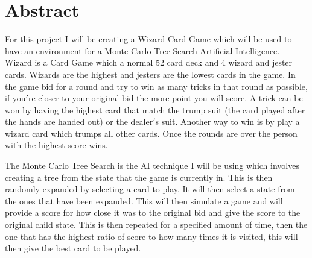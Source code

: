 \thispagestyle{empty}


\section*{\centering Abstract}

For this project I will be creating a Wizard Card Game which will be used to have an environment for a Monte Carlo Tree Search Artificial Intelligence. Wizard is a Card Game which a normal 52 card deck and 4 wizard and jester cards. Wizards are the highest and jesters are the lowest cards in the game. In the game bid for a round and try to win as many tricks in that round as possible, if you$'$re closer to your original bid the more point you will score. A trick can be won by having the highest card that match the trump suit (the card played after the hands are handed out) or the dealer$'$s suit. Another way to win is by play a wizard card which trumps all other cards. Once the rounds are over the person with the highest score wins.

The Monte Carlo Tree Search is the AI technique I will be using which involves creating a tree from the state that the game is currently in. This is then randomly expanded by selecting a card to play. It will then select a state from the ones that have been expanded. This will then simulate a game and will provide a score for how close it was to the original bid and give the score to the original child state. This is then repeated for a specified amount of time, then the one that has the highest ratio of score to how many times it is visited, this will then give the best card to be played.

